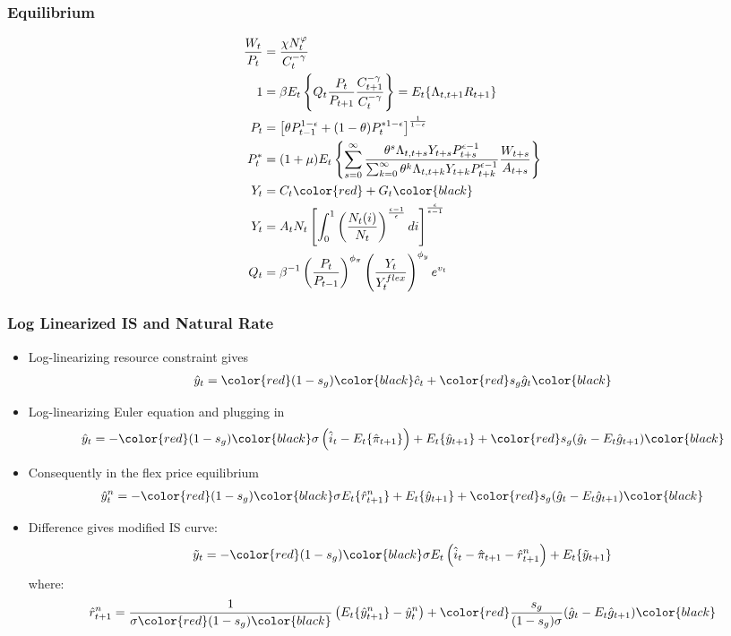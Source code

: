\documentclass[english,xcolor=svgnames]{beamer}
\begin{document}
\begin{frame}
\frametitle{Equilibrium}
\begin{align*}
	\frac{W_t}{P_t}&=\frac{\chi N_t^\varphi}{C_t^{-\gamma}} \\
	1&=\beta E_t\left\{Q_t \frac{P_t}{P_{t+1}} \frac{C_{t+1}^{-\gamma}}{C_{t}^{-\gamma}}\right\}=E_{t}\{\Lambda_{t,t+1}R_{t+1}\} \\
	P_t&=\left[\theta P_{t-1}^{1-\epsilon} + (1-\theta) P_{t}^{*1-\epsilon}\right]^{\frac{1}{1-\epsilon}} \\
	P_t^* &=  (1+\mu)E_t\left\{\sum_{s=0}^{\infty}\frac{\theta^s\Lambda_{t,t+s}Y_{t+s}P_{t+s}^{\epsilon-1}}{\sum_{k=0}^{\infty}\theta^k\Lambda_{t,t+k}Y_{t+k}P_{t+k}^{\epsilon-1}}\frac{W_{t+s}}{A_{t+s}}\right\} \\
	Y_t&=C_t\color{red}+G_t\color{black} \\
Y_t&=A_tN_t\left[\int_0^1\left(\frac{N_t(i)}{N_t}\right)^{\frac{\epsilon-1}{\epsilon}}di\right]^{\frac{\epsilon}{\epsilon-1}} \\
	Q_t &= \beta^{-1}\left(\frac{P_t}{P_{t-1}}\right)^{\phi_{\pi}}\left(\frac{Y_t}{Y_t^{flex}}\right)^{\phi_{y}}e^{v_t}
\end{align*}	
\end{frame}


\begin{frame}
\frametitle{Log Linearized IS and Natural Rate}
\begin{itemize}
	\item Log-linearizing resource constraint gives
	\begin{align*}
		\hat{y}_t=\color{red}(1-s_g)\color{black}\hat{c}_t + \color{red}s_g \hat{g}_t\color{black}
	\end{align*}
	\item Log-linearizing Euler equation and plugging in
	\begin{align*}
		\hat{y}_t=-\color{red}(1-s_g)\color{black}\sigma\left(\hat{i}_t-E_t\{\hat{\pi}_{t+1}\}\right) + E_t\{\hat{y}_{t+1}\} + \color{red}s_g (\hat{g}_t-E_t\hat{g}_{t+1})\color{black}
	\end{align*}
	\item Consequently in the flex price equilibrium
	\begin{align*}
		\hat{y}_t^n=-\color{red}(1-s_g)\color{black}\sigma E_t\{\hat{r}_{t+1}^n\} + E_t\{\hat{y}_{t+1}\} + \color{red}s_g (\hat{g}_t-E_t\hat{g}_{t+1})\color{black}
	\end{align*}
	\item Difference gives modified IS curve:
	\begin{align*}
		\tilde{y}_t=-\color{red}(1-s_g)\color{black}\sigma E_t\left(\hat{i}_t-\hat{\pi}_{t+1}-\hat{r}_{t+1}^n\right) + E_t\{\tilde{y}_{t+1}\} 
	\end{align*}
	where:
	\begin{align*}
		\hat{r}_{t+1}^n = \frac{1}{\sigma\color{red}(1-s_g)\color{black}}\left(E_t\{\hat{y}_{t+1}^n\}-\hat{y}_t^n\right) + \color{red}\frac{s_g}{(1-s_g)\sigma} (\hat{g}_t-E_t\hat{g}_{t+1})\color{black}
	\end{align*}
\end{itemize}
\end{frame}
\end{document}
